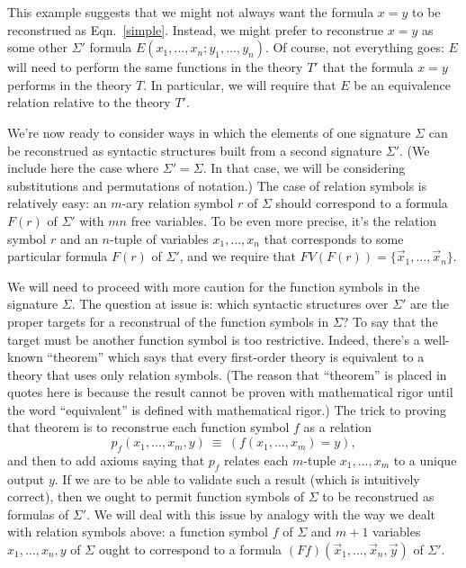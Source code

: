 This example suggests that we might not always want the formula $x=y$
to be reconstrued as Eqn.\ \ref{simple}.  Instead, we might prefer to
reconstrue $x=y$ as some other $\Sigma '$ formula
$E(x_1,\dots ,x_n;y_1,\dots ,y_n)$.  Of course, not everything goes:
$E$ will need to perform the same functions in the theory $T'$ that
the formula $x=y$ performs in the theory $T$.  In particular, we will
require that $E$ be an equivalence relation relative to the theory
$T'$.

We're now ready to consider ways in which the elements of one
signature $\Sigma$ can be reconstrued as syntactic structures built
from a second signature $\Sigma '$.  (We include here the case where
$\Sigma '=\Sigma$.  In that case, we will be considering substitutions
and permutations of notation.)  The case of relation symbols is
relatively easy: an $m$-ary relation symbol $r$ of $\Sigma$ should
correspond to a formula $F(r)$ of $\Sigma '$ with $mn$ free variables.
To be even more precise, it's the relation symbol $r$ and an $n$-tuple
of variables $x_1,\dots ,x_n$ that corresponds to some particular
formula $F(r)$ of $\Sigma '$, and we require that
$FV(F(r))=\{ \vec{x}_1,\dots ,\vec{x}_n \}$.

We will need to proceed with more caution for the function symbols in
the signature $\Sigma$.  The question at issue is: which syntactic
structures over $\Sigma '$ are the proper targets for a reconstrual of
the function symbols in $\Sigma$?  To say that the target must be
another function symbol is too restrictive.  Indeed, there's a
well-known ``theorem'' which says that every first-order theory is
equivalent to a theory that uses only relation symbols.  (The reason
that ``theorem'' is placed in quotes here is because the result cannot
be proven with mathematical rigor until the word ``equivalent'' is
defined with mathematical rigor.)  The trick to proving that theorem
is to reconstrue each function symbol $f$ as a relation
\[ p_f(x_1,\dots ,x_m,y) \: \equiv \: (f(x_1,\dots ,x_m) = y) ,\] and
then to add axioms saying that $p_f$ relates each $m$-tuple
$x_1,\dots ,x_m$ to a unique output $y$.  If we are to be able to
validate such a result (which is intuitively correct), then we ought
to permit function symbols of $\Sigma$ to be reconstrued as formulas
of $\Sigma '$.  We will deal with this issue by analogy with the way
we dealt with relation symbols above: a function symbol $f$ of
$\Sigma$ and $m+1$ variables $x_1,\dots ,x_n,y$ of $\Sigma$ ought to
correspond to a formula $(Ff)(\vec{x}_1,\dots ,\vec{x}_n,\vec{y})$ of
$\Sigma '$.


